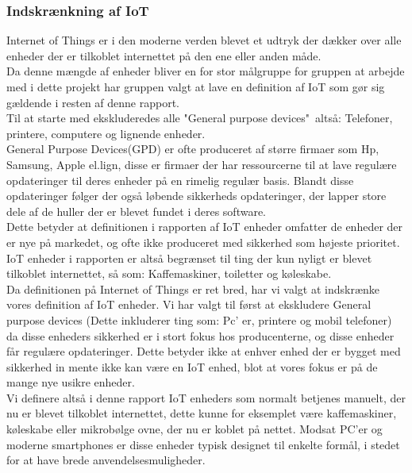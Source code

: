     
            \subsubsection{Indskrænkning af IoT}
            Internet of Things er i den moderne verden blevet et udtryk der dækker over alle enheder der er tilkoblet internettet på den ene eller anden måde.\\
            Da denne mængde af enheder bliver en for stor målgruppe for gruppen at arbejde med i dette projekt har gruppen valgt at lave en definition af IoT som gør sig gældende i resten af denne rapport. \\
            Til at starte med ekskluderedes alle "General purpose devices"\ altså: Telefoner, printere, computere og lignende enheder. \\
            General Purpose Devices(GPD) er ofte produceret af større firmaer som Hp, Samsung, Apple el.lign, disse er firmaer der har ressourcerne til at lave regulære opdateringer til deres enheder på en rimelig regulær basis. Blandt disse opdateringer følger der også løbende sikkerheds opdateringer, der lapper store dele af de huller der er blevet fundet i deres software.\\
            Dette betyder at definitionen i rapporten af IoT enheder omfatter de enheder der er nye på markedet, og ofte ikke produceret med sikkerhed som højeste prioritet. IoT enheder i rapporten er altså begrænset til ting der kun nyligt er blevet tilkoblet internettet, så som: Kaffemaskiner, toiletter og køleskabe. \\
            
            
            
            Da definitionen på Internet of Things er ret bred, har vi valgt at indskrænke vores definition af IoT enheder. Vi har valgt til først at ekskludere General purpose devices (Dette inkluderer ting som: Pc' er, printere og mobil telefoner) da disse enheders sikkerhed er i stort fokus hos producenterne, og disse enheder får regulære opdateringer. Dette betyder ikke at enhver enhed der er bygget med sikkerhed
            in mente ikke kan være en IoT enhed, blot at vores fokus er på de mange nye usikre enheder.\\
            Vi definere altså i denne rapport IoT enheders som normalt betjenes manuelt, der nu er blevet tilkoblet internettet, dette kunne for eksemplet være kaffemaskiner, køleskabe eller mikrobølge ovne, der nu er koblet på nettet. Modsat PC'er og moderne smartphones er disse enheder typisk designet til enkelte formål, i stedet for at have brede anvendelsesmuligheder.

\newpage



